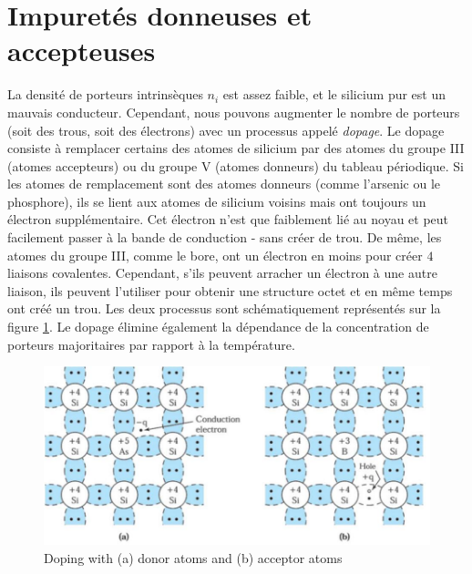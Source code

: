 \section{Impuretés donneuses et accepteuses}
La densité de porteurs intrinsèques $n_i$ est assez faible, et le silicium pur est un mauvais conducteur. Cependant, nous pouvons augmenter le nombre de porteurs (soit des trous, soit des électrons) avec un processus appelé \emph{dopage}. Le dopage consiste à remplacer certains des atomes de silicium par des atomes du groupe III (atomes accepteurs) ou du groupe V (atomes donneurs) du tableau périodique. Si les atomes de remplacement sont des atomes donneurs (comme l'arsenic ou le phosphore), ils se lient aux atomes de silicium voisins mais ont toujours un électron supplémentaire. Cet électron n'est que faiblement lié au noyau et peut facilement passer à la bande de conduction - sans créer de trou. De même, les atomes du groupe III, comme le bore, ont un électron en moins pour créer $4$ liaisons covalentes. Cependant, s'ils peuvent arracher un électron à une autre liaison, ils peuvent l'utiliser pour obtenir une structure octet et en même temps ont créé un trou. Les deux processus sont schématiquement représentés sur la figure \ref{fig:doping}. Le dopage élimine également la dépendance de la concentration de porteurs majoritaires par rapport à la température.

\begin{figure}[h!]
\centering
\includegraphics[width=12cm]{figures/ch01/doping.jpg}
\caption{Doping with (a) donor atoms and (b) acceptor atoms} 
\label{fig:doping}
\end{figure} 


